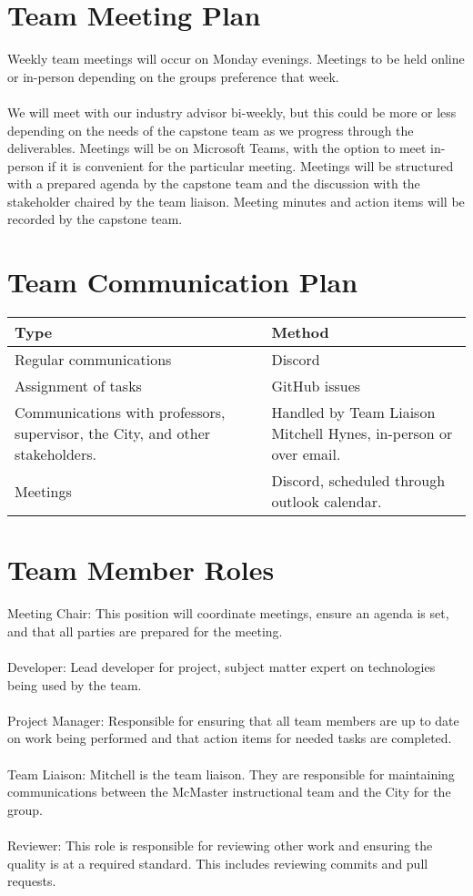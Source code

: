 \documentclass{article}
\begin{document}
\section{Team Meeting Plan}

Weekly team meetings will occur on Monday evenings. Meetings to be held online or in-person depending on
the groups preference that week.\\
\\
We will meet with our industry advisor bi-weekly, but this could be more or less depending on the needs of
the capstone team as we progress through the deliverables. Meetings will be on Microsoft Teams, with the
option to meet in-person if it is convenient for the particular meeting. Meetings will be structured with a
prepared agenda by the capstone team and the discussion with the stakeholder chaired by the team liaison.
Meeting minutes and action items will be recorded by the capstone team.


\section{Team Communication Plan}

\begin{longtable}{|m{5cm}|m{8cm}|}
  \hline
  \textbf{Type} & \textbf{Method}\\
  \hline
  Regular communications & Discord\\
  \hline
  Assignment of tasks & GitHub issues\\
  \hline
  Communications with professors, supervisor, the City, and other stakeholders. & Handled by Team Liaison Mitchell Hynes,
  in-person or over email.\\
  \hline
  Meetings & Discord, scheduled through outlook calendar.\\
  \hline
\end{longtable}

\section{Team Member Roles}

Meeting Chair: This position will coordinate meetings, ensure an agenda is set, and that all parties are
prepared for the meeting.\\
\\
Developer: Lead developer for project, subject matter expert on technologies being used by the team.\\
\\
Project Manager: Responsible for ensuring that all team members are up to date on work being performed
and that action items for needed tasks are completed.\\
\\
Team Liaison: Mitchell is the team liaison. They are responsible for maintaining communications between the
McMaster instructional team and the City for the group.\\
\\
Reviewer: This role is responsible for reviewing other work and ensuring the quality is at a required standard.
This includes reviewing commits and pull requests.
\end{document}
